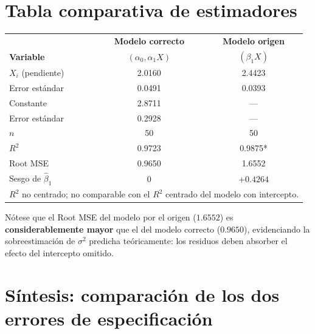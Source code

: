 \documentclass[12pt, letterpaper]{article}
\begin{document}
\section{Tabla comparativa de estimadores}

\begin{center}
\renewcommand{\arraystretch}{1.3}
\small
\begin{tabular}{lcc}
\toprule
                              & \textbf{Modelo correcto} & \textbf{Modelo origen} \\
\textbf{Variable}             & $(\alpha_0, \alpha_1 X)$   & $(\beta_1 X)$         \\
\midrule
$X_i$ (pendiente)             & 2.0160  & 2.4423  \\
Error estándar                & 0.0491  & 0.0393  \\
Constante                     & 2.8711  & ---     \\
Error estándar                & 0.2928  & ---     \\
\midrule
$n$                           & 50      & 50      \\
$R^2$                         & 0.9723  & 0.9875* \\
Root MSE                      & 0.9650  & 1.6552  \\
\midrule
Sesgo de $\hat{\beta}_1$      & 0       & $+0.4264$ \\
\bottomrule
\multicolumn{3}{l}{\footnotesize * $R^2$ no centrado; no comparable con el $R^2$ centrado del modelo con intercepto.}
\end{tabular}
\end{center}

Nótese que el Root MSE del modelo por el origen ($1.6552$) es
\textbf{considerablemente mayor} que el del modelo correcto ($0.9650$),
evidenciando la sobreestimación de $\sigma^2$ predicha teóricamente:
los residuos deben absorber el efecto del intercepto omitido.

\section{Síntesis: comparación de los dos errores de especificación}
\end{document}
